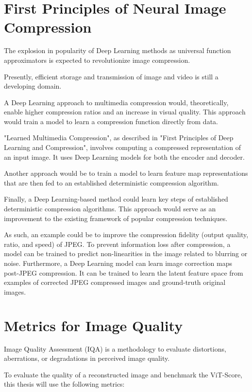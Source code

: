 \section{First Principles of Neural Image Compression}

The explosion in popularity of Deep Learning methods as universal function approximators
is expected to revolutionize image compression.

Presently, efficient storage and transmission of image and video is still a developing domain.

A Deep Learning approach to multimedia compression would, theoretically, enable higher compression ratios 
and an increase in visual quality. This approach would train a model to learn a compression function directly from data. 

"Learned Multimedia Compression", as described in "First Principles of Deep Learning and Compression", involves
computing a compressed representation of an input image. It uses Deep Learning models for both the encoder and decoder.
\citep{FirstPrinciples}


Another approach would be to train a model to learn feature map representations that are then fed 
to an established deterministic compression algorithm. 

Finally, a Deep Learning-based method could learn key steps of established deterministic compression algorithms.
This approach would serve as an improvement to the existing framework of popular compression techniques.

As such, an example could be to improve the compression fidelity (output quality, ratio, and speed) of JPEG. 
To prevent information loss after compression, a model can be trained to predict non-linearities in the image related to blurring or noise.
Furthermore, a Deep Learning model can learn image correction maps post-JPEG compression. 
It can be trained to learn the latent feature space from examples of corrected JPEG compressed images and
ground-truth original images. 


\section{Metrics for Image Quality}

Image Quality Assessment (IQA) is a methodology to evaluate distortions, aberrations, or
degradations in perceived image quality.

To evaluate the quality of a reconstructed image and benchmark the ViT-Score,
this thesis will use the following metrics:

